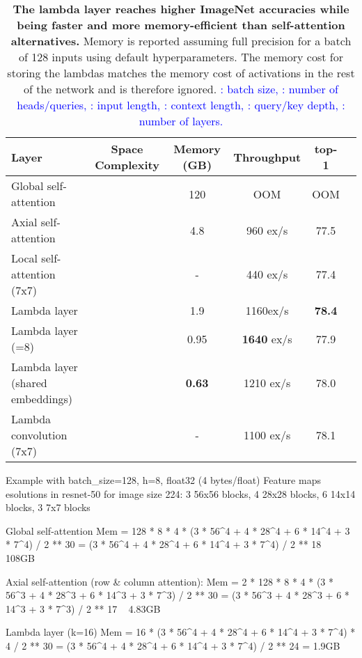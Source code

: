 \documentclass{article} \usepackage{iclr2021_conference,times}
\begin{document}
\begin{table}[h]
  \begin{center}
  \small
  \begin{tabular}{lccccc}
    \toprule
    Layer & Space Complexity & Memory (GB) & Throughput & top-1 \\
    \midrule
    Global self-attention &  & 120 & OOM & OOM \\
    Axial self-attention &  & 4.8 & 960 ex/s & 77.5 \\
    Local self-attention (7x7) &  & - & 440 ex/s & 77.4 \\ \midrule
    Lambda layer &  & 1.9 & 1160ex/s & \textbf{78.4} \\
    Lambda layer (=8) &  & 0.95 & \textbf{1640} ex/s & 77.9 \\
    Lambda layer (shared embeddings) &  & \textbf{0.63} & 1210 ex/s & 78.0 \\
    Lambda convolution (7x7) &  & - & 1100 ex/s & 78.1 \\
    \bottomrule
  \end{tabular}
  \caption{\textbf{The lambda layer reaches higher ImageNet accuracies while being faster and more memory-efficient than self-attention alternatives.}
  Memory is reported assuming full precision for a batch of 128 inputs using default hyperparameters.
  The memory cost for storing the lambdas matches the memory cost of activations in the rest of the network and is therefore ignored.
  \textcolor{blue}{
  : batch size, : number of heads/queries, : input length, : context length, : query/key depth, : number of layers.}
  }
  \label{tab:memory_comparison}
  \vspace{-0.3cm}
  \end{center}
\end{table}

\iffalse
Example with batch_size=128, h=8, float32 (4 bytes/float)
Feature maps esolutions in resnet-50 for image size 224:
3 56x56 blocks, 4 28x28 blocks, 6 14x14 blocks, 3 7x7 blocks

Global self-attention
Mem = 128 * 8 * 4 * (3 * 56^4 + 4 * 28^4 + 6 * 14^4 + 3 * 7^4) / 2 ** 30
    = (3 * 56^4 + 4 * 28^4 + 6 * 14^4 + 3 * 7^4) / 2 ** 18
    ~ 108GB
  
Axial self-attention (row & column attention): 
Mem = 2 * 128 * 8 * 4 * (3 * 56^3 + 4 * 28^3 + 6 * 14^3 + 3 * 7^3) / 2 ** 30 
    = (3 * 56^3 + 4 * 28^3 + 6 * 14^3 + 3 * 7^3) / 2 ** 17 
    ~ 4.83GB

Lambda layer (k=16)
Mem = 16 * (3 * 56^4 + 4 * 28^4 + 6 * 14^4 + 3 * 7^4) * 4 / 2 ** 30
    = (3 * 56^4 + 4 * 28^4 + 6 * 14^4 + 3 * 7^4) / 2 ** 24
    = 1.9GB 
\end{document}
